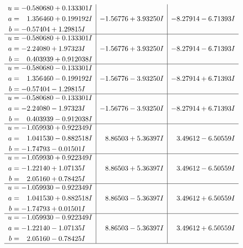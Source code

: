 \documentclass[1p]{elsarticle_modified}
\theoremstyle{definition}
\begin{document}
$$\begin{array}{c|c|c}
\begin{aligned}
u &= -0.580680 + 0.133301 I \\
a &= \phantom{-}1.356460 + 0.199192 I \\
b &= -0.57404 + 1.29815 I\end{aligned}
 & -1.56776 + 3.93250 I & -8.27914 - 6.71393 I \\ \hline\begin{aligned}
u &= -0.580680 + 0.133301 I \\
a &= -2.24080 + 1.97323 I \\
b &= \phantom{-}0.403939 + 0.912038 I\end{aligned}
 & -1.56776 + 3.93250 I & -8.27914 - 6.71393 I \\ \hline\begin{aligned}
u &= -0.580680 - 0.133301 I \\
a &= \phantom{-}1.356460 - 0.199192 I \\
b &= -0.57404 - 1.29815 I\end{aligned}
 & -1.56776 - 3.93250 I & -8.27914 + 6.71393 I \\ \hline\begin{aligned}
u &= -0.580680 - 0.133301 I \\
a &= -2.24080 - 1.97323 I \\
b &= \phantom{-}0.403939 - 0.912038 I\end{aligned}
 & -1.56776 - 3.93250 I & -8.27914 + 6.71393 I \\ \hline\begin{aligned}
u &= -1.059930 + 0.922349 I \\
a &= \phantom{-}1.041530 - 0.882518 I \\
b &= -1.74793 - 0.01501 I\end{aligned}
 & \phantom{-}8.86503 + 5.36397 I & \phantom{-}3.49612 - 6.50559 I \\ \hline\begin{aligned}
u &= -1.059930 + 0.922349 I \\
a &= -1.22140 + 1.07135 I \\
b &= \phantom{-}2.05160 + 0.78425 I\end{aligned}
 & \phantom{-}8.86503 + 5.36397 I & \phantom{-}3.49612 - 6.50559 I \\ \hline\begin{aligned}
u &= -1.059930 - 0.922349 I \\
a &= \phantom{-}1.041530 + 0.882518 I \\
b &= -1.74793 + 0.01501 I\end{aligned}
 & \phantom{-}8.86503 - 5.36397 I & \phantom{-}3.49612 + 6.50559 I \\ \hline\begin{aligned}
u &= -1.059930 - 0.922349 I \\
a &= -1.22140 - 1.07135 I \\
b &= \phantom{-}2.05160 - 0.78425 I\end{aligned}
 & \phantom{-}8.86503 - 5.36397 I & \phantom{-}3.49612 + 6.50559 I\\
 \hline 
 \end{array}$$\newpage\newpage\renewcommand{\arraystretch}{1}
\end{document}
